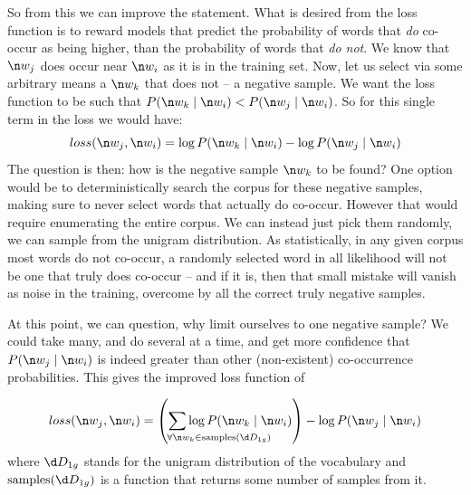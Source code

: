 {So from this we can improve the statement.
What is desired from the loss function is to reward models that predict  the probability of words that \emph{do} co-occur as being higher, than the probability of words that \emph{do not}.
We know that $\n w_j$ does occur near $\n w_i$ as it is in the training set.
Now, let us select via some arbitrary means a $\n w_k$ that does not -- a negative sample.
We want the loss function to be such that $P(\n w_k\mid \n w_i) < P(\n w_j\mid \n w_i)$.
So for this single term in the loss we would have:
\begin{equation}
loss(\n w_j,\n w_i) =  \log P(\n w_k\mid \n w_i) - \log P(\n w_j\mid \n w_i)
\end{equation}
%
%
%
The question is then: how is the negative sample $\n w_k$ to be found?
One option would be to deterministically search the corpus for these negative samples, making sure to never select words that actually do co-occur.
However that would require enumerating the entire corpus.
We can instead just pick them randomly, we can sample from the unigram distribution.
As statistically, in any given corpus most words do not co-occur, 
a randomly selected word in all likelihood will not be one that truly does co-occur
-- and if it is, then that small mistake will vanish as noise in the training,
overcome by all the correct truly negative samples.


At this point, we can question, why limit ourselves to one negative sample?
We could take many, and do several at a time,
and get more confidence that $P(\n w_j\mid \n w_i)$ is indeed greater than other (non-existent) co-occurrence probabilities.
This gives the improved loss function of 

\begin{equation}
loss(\n w_j,\n w_i) = 
\left(\sum_{\mathrlap{\!\!\!\!\!\!\forall \n w_k \in \mathrm{samples}(\d D_{1g})}}
\log P(\n w_k\mid \n w_i) \right)
- \log P(\n w_j\mid \n w_i)
\label{equ:samplesloss}
\end{equation}
where $\d D_{1g}$ stands for the unigram distribution of the vocabulary
and $\mathrm{samples}(\d D_{1g})$ is a function that returns some number of samples from it.

}
